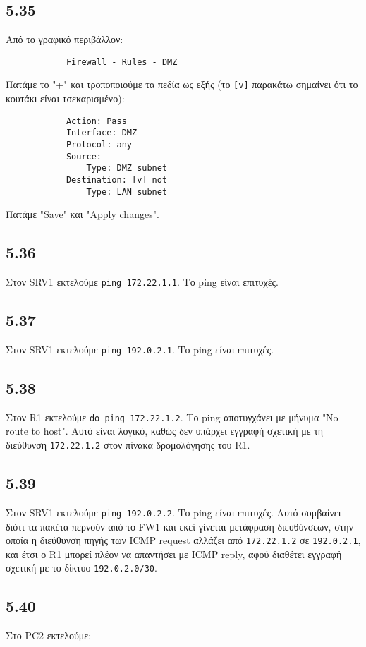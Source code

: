 \documentclass[a4paper, 12pt]{article}
\begin{document}
	\subsection*{5.35}
		Από το γραφικό περιβάλλον:
		
		\begin{verbatim}
			Firewall - Rules - DMZ
		\end{verbatim}
		
		Πατάμε το "+" και τροποποιούμε τα πεδία ως εξής (το \verb|[v]| παρακάτω σημαίνει ότι το κουτάκι είναι τσεκαρισμένο):
		
		\begin{verbatim}
			Action: Pass
			Interface: DMZ
			Protocol: any
			Source: 
			    Type: DMZ subnet
			Destination: [v] not 
			    Type: LAN subnet
		\end{verbatim}
		
		Πατάμε "Save" και "Apply changes".

	\subsection*{5.36}
		Στον SRV1 εκτελούμε \verb|ping 172.22.1.1|. Το ping είναι επιτυχές.

	\subsection*{5.37}
		Στον SRV1 εκτελούμε \verb|ping 192.0.2.1|. Το ping είναι επιτυχές.

	\subsection*{5.38}
		Στον R1 εκτελούμε \verb|do ping 172.22.1.2|. Το ping αποτυγχάνει με μήνυμα "No route to host". Αυτό είναι λογικό, καθώς δεν υπάρχει εγγραφή σχετική με τη διεύθυνση \verb|172.22.1.2| στον πίνακα δρομολόγησης του R1.

	\subsection*{5.39}
		Στον SRV1 εκτελούμε \verb|ping 192.0.2.2|. Το ping είναι επιτυχές. Αυτό συμβαίνει διότι τα πακέτα περνούν από το FW1 και εκεί γίνεται μετάφραση διευθύνσεων, στην οποία η διεύθυνση πηγής των ICMP request αλλάζει από \verb|172.22.1.2| σε \verb|192.0.2.1|, και έτσι ο R1 μπορεί πλέον να απαντήσει με ICMP reply, αφού διαθέτει εγγραφή σχετική με το δίκτυο \verb|192.0.2.0/30|. 

	\subsection*{5.40}
		Στο PC2 εκτελούμε:
		
\end{document}
